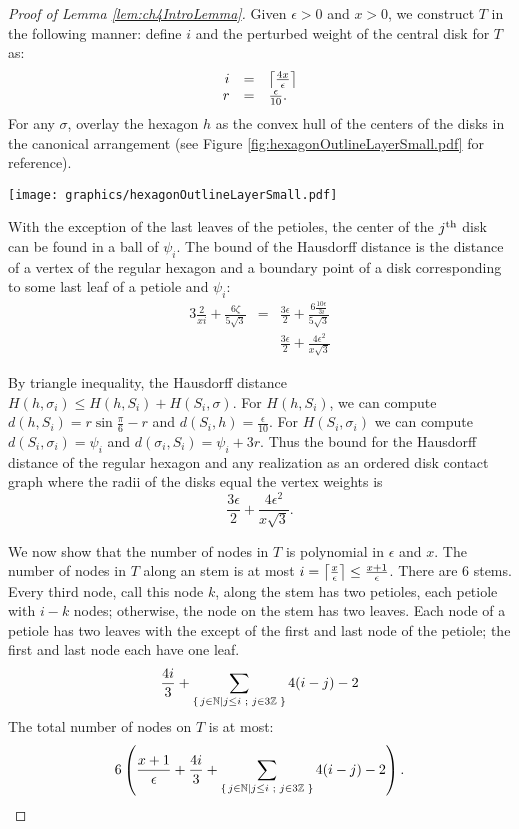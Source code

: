 \begin{proof}[Proof of Lemma \ref{lem:ch4IntroLemma}]
Given $\epsilon > 0$ and $x>0$, we construct $T$ in the following manner: define $i$ and the perturbed weight of the central disk for $T$ as:
$$
\begin{array}{rcl}
i &=& \left\lceil \frac{4x}{\epsilon} \right\rceil\\
r &=& \frac{\epsilon}{10}.
\end{array}
$$
For any $\sigma$, overlay the hexagon $h$ as the convex hull of the centers of the disks in the canonical arrangement (see Figure \ref{fig:hexagonOutlineLayerSmall.pdf} for reference).  

\begin{minipage}{\linewidth}
\begin{center}
\texttt{[image: graphics/hexagonOutlineLayerSmall.pdf]}
\label{fig:hexagonOutlineLayerSmall.pdf}
\end{center}
\end{minipage}


With the exception of the last leaves of the petioles, the center of the $j^\text{th}$ disk can be found in a ball of $\psi_i$.  
The bound of the Hausdorff distance is the distance of a vertex of the regular hexagon and a boundary point of a disk corresponding to some last leaf of a petiole and $\psi_i$:
$$\begin{array}{rcl}
3 \frac{2}{xi} + \frac{6 \zeta}{5 \sqrt{3}}&=& \frac{3 \epsilon}{2}+ \frac{6 \frac{10\epsilon}{3i}}{5 \sqrt{3}}\\
&&\frac{3 \epsilon}{2}+\frac{4 \epsilon^2 }{x \sqrt{3}}
\end{array}
$$

By triangle inequality, the Hausdorff distance $H(h, \sigma_i) \leq H(h, S_i) + H(S_i, \sigma)$.  For $H(h,S_i)$, we can compute $d(h,S_i)=r\sin \frac{\pi}{6} - r$ and $d(S_i,h)= \frac{\epsilon}{10	}$.  
For $H(S_i,\sigma_i)$ we can compute $d(S_i,\sigma_i)=\psi_i$ and $d(\sigma_i, S_i)=\psi_i + 3r$. 
Thus the bound for the Hausdorff distance of the regular hexagon and any realization as an ordered disk contact graph where the radii of the disks equal the vertex weights is $$\frac{3 \epsilon}{2}+\frac{4 \epsilon^2 }{x \sqrt{3}}.$$

We now show that the number of nodes in $T$ is polynomial in $\epsilon$ and $x$.  
The number of nodes in $T$ along an stem is at most $i=\left\lceil \frac{x}{\epsilon} \right\rceil \leq \frac{x+1}{\epsilon}$.  There are 6 stems.
Every third node, call this node $k$, along the stem has two petioles, each petiole with $i-k$ nodes; otherwise, the node on the stem has two leaves.  
Each node of a petiole has two leaves with the except of the first and last node of the petiole; the first and last node each have one leaf.   
$$\frac{4i}{3}  + \sum_{{\left\lbrace \left. j \in {\mathbb{N}} \left\vert j \leq i \text{ ; } j \in 3{\mathbb{Z}} \right.\right.\right\rbrace }} 4(i - j) - 2$$
The total number of nodes on $T$ is at most:
$$6 \left( \frac{x+1}{\epsilon} + \frac{4i}{3}   + \sum_{{\left\lbrace \left. j \in {\mathbb{N}} \left\vert j \leq i \text{ ; } j \in 3{\mathbb{Z}} \right.\right.\right\rbrace }} 4(i - j) - 2 \right).$$

\end{proof}

